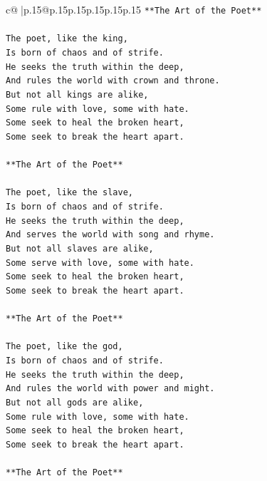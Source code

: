 \documentclass{article}
\begin{document}
{\begin{supertabular}{c@{$\;$}|p{.15\linewidth}@{}p{.15\linewidth}p{.15\linewidth}p{.15\linewidth}p{.15\linewidth}p{.15\linewidth}}
{{{\texttt{**The Art of the Poet**} \\
\\ 
\texttt{The poet, like the king,} \\
\texttt{Is born of chaos and of strife.} \\
\texttt{He seeks the truth within the deep,} \\
\texttt{And rules the world with crown and throne.} \\
\texttt{But not all kings are alike,} \\
\texttt{Some rule with love, some with hate.} \\
\texttt{Some seek to heal the broken heart,} \\
\texttt{Some seek to break the heart apart.} \\
\\ 
\texttt{**The Art of the Poet**} \\
\\ 
\texttt{The poet, like the slave,} \\
\texttt{Is born of chaos and of strife.} \\
\texttt{He seeks the truth within the deep,} \\
\texttt{And serves the world with song and rhyme.} \\
\texttt{But not all slaves are alike,} \\
\texttt{Some serve with love, some with hate.} \\
\texttt{Some seek to heal the broken heart,} \\
\texttt{Some seek to break the heart apart.} \\
\\ 
\texttt{**The Art of the Poet**} \\
\\ 
\texttt{The poet, like the god,} \\
\texttt{Is born of chaos and of strife.} \\
\texttt{He seeks the truth within the deep,} \\
\texttt{And rules the world with power and might.} \\
\texttt{But not all gods are alike,} \\
\texttt{Some rule with love, some with hate.} \\
\texttt{Some seek to heal the broken heart,} \\
\texttt{Some seek to break the heart apart.} \\
\\ 
\texttt{**The Art of the Poet**} \\
}}}
\end{supertabular}}
\end{document}
